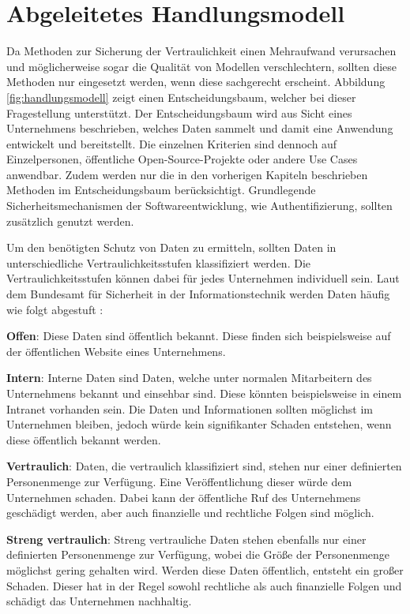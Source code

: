 \chapter{Abgeleitetes Handlungsmodell}\label{ch:handlungsmodell}

Da Methoden zur Sicherung der Vertraulichkeit einen Mehraufwand verursachen und möglicherweise sogar die Qualität von Modellen verschlechtern, sollten diese Methoden nur eingesetzt werden, wenn diese sachgerecht erscheint. 
Abbildung \ref{fig:handlungsmodell} zeigt einen Entscheidungsbaum, welcher bei dieser Fragestellung unterstützt.
Der Entscheidungsbaum wird aus Sicht eines Unternehmens beschrieben, welches Daten sammelt und damit eine Anwendung entwickelt und bereitstellt.
Die einzelnen Kriterien sind dennoch auf Einzelpersonen, öffentliche Open-Source-Projekte oder andere Use Cases anwendbar.
Zudem werden nur die in den vorherigen Kapiteln beschrieben Methoden im Entscheidungsbaum berücksichtigt. 
Grundlegende Sicherheitsmechanismen der Softwareentwicklung, wie \zB Authentifizierung, sollten zusätzlich genutzt werden.

Um den benötigten Schutz von Daten zu ermitteln, sollten Daten in unterschiedliche Vertraulichkeitsstufen klassifiziert werden.
Die Vertraulichkeitsstufen können dabei für jedes Unternehmen individuell sein.
Laut dem Bundesamt für Sicherheit in der Informationstechnik werden Daten häufig wie folgt abgestuft \cite{bsi_200_2}:
\begin{compactitem}
    \item \textbf{Offen}: Diese Daten sind öffentlich bekannt. Diese finden sich beispielsweise auf der öffentlichen Website eines Unternehmens.
    \item \textbf{Intern}: Interne Daten sind Daten, welche unter normalen Mitarbeitern des Unternehmens bekannt und einsehbar sind. Diese könnten beispielsweise in einem Intranet vorhanden sein. Die Daten und Informationen sollten möglichst im Unternehmen bleiben, jedoch würde kein signifikanter Schaden entstehen, wenn diese öffentlich bekannt werden.
    \item \textbf{Vertraulich}: Daten, die vertraulich klassifiziert sind, stehen nur einer definierten Personenmenge zur Verfügung. Eine Veröffentlichung dieser würde dem Unternehmen schaden. Dabei kann der öffentliche Ruf des Unternehmens geschädigt werden, aber auch finanzielle und rechtliche Folgen sind möglich.
    \item \textbf{Streng vertraulich}: Streng vertrauliche Daten stehen ebenfalls nur einer definierten Personenmenge zur Verfügung, wobei die Größe der Personenmenge möglichst gering gehalten wird. Werden diese Daten öffentlich, entsteht ein großer Schaden. Dieser hat in der Regel sowohl rechtliche als auch finanzielle Folgen und schädigt das Unternehmen nachhaltig.
\end{compactitem}

